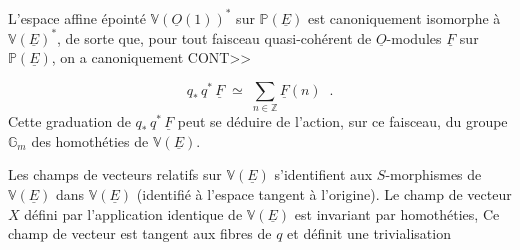 \begin{center}
\end{center}
L'espace affine \'epoint\'e $\mathbb{V}(\underline{O}(1))^*$ sur $\mathbb{P}(\underline{E})$ est canoniquement isomorphe \`a $\mathbb{V}(\underline{E})^*$, de sorte que, pour tout faisceau quasi-coh\'erent de $\underline{O}$-modules $\underline{F}$ sur $\mathbb{P}(\underline{E})$, on a canoniquement CONT>>



\begin{equation}\tag{1.1.1}
q_* \, q^* \, \underline{F} \;\simeq\; \sum_{n \in \mathbb{Z}} \underline{F}(n) \;\; .
\end{equation}
Cette graduation de $q_* \, q^* \, \underline{F}$ peut se déduire de l'action, sur ce faisceau, du groupe $\mathbb{G}_m$ des homothéties de $\mathbb{V}(\underline{E})$.

Les champs de vecteurs relatifs sur $\mathbb{V}(\underline{E})$ s'identifient aux $S$-morphismes de $\mathbb{V}(\underline{E})$ dans $\mathbb{V}(\underline{E})$ (identifié à l'espace tangent à l'origine). Le champ de vecteur $X$ défini par l'application identique de $\mathbb{V}(\underline{E})$ est invariant par homothéties, Ce champ de vecteur est tangent aux fibres de $q$ et définit une trivialisation

